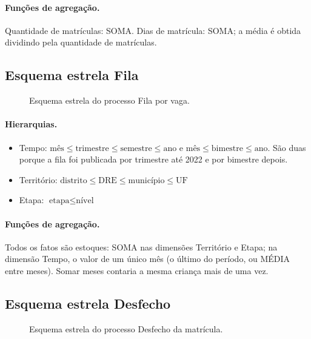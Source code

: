 \documentclass[11pt,a4paper]{article}
\newcommand{\hier}[1]{$#1$}
\begin{document}
\paragraph{Funções de agregação.} Quantidade de matrículas: SOMA. Dias de matrícula: SOMA; a média é obtida dividindo pela quantidade de matrículas.

\subsection{Esquema estrela Fila}

\begin{figure}[H]
\centering
\resizebox{0.9\linewidth}{!}{}
\caption{Esquema estrela do processo Fila por vaga.}
\end{figure}

\paragraph{Hierarquias.}
\begin{itemize}
\item Tempo: \hier{\text{mês} \leq \text{trimestre} \leq \text{semestre} \leq \text{ano}} e \hier{\text{mês} \leq \text{bimestre} \leq \text{ano}}. São duas porque a fila foi publicada por trimestre até 2022 e por bimestre depois.
\item Território: \hier{\text{distrito} \leq \text{DRE} \leq \text{município} \leq \text{UF}}
\item Etapa: \hier{\text{etapa} \leq \text{nível}}
\end{itemize}

\paragraph{Funções de agregação.} Todos os fatos são estoques: SOMA nas dimensões Território e Etapa; na dimensão Tempo, o valor de um único mês (o último do período, ou MÉDIA entre meses). Somar meses contaria a mesma criança mais de uma vez.

\subsection{Esquema estrela Desfecho}

\begin{figure}[H]
\centering
\resizebox{0.9\linewidth}{!}{}
\caption{Esquema estrela do processo Desfecho da matrícula.}
\end{figure}
\end{document}
